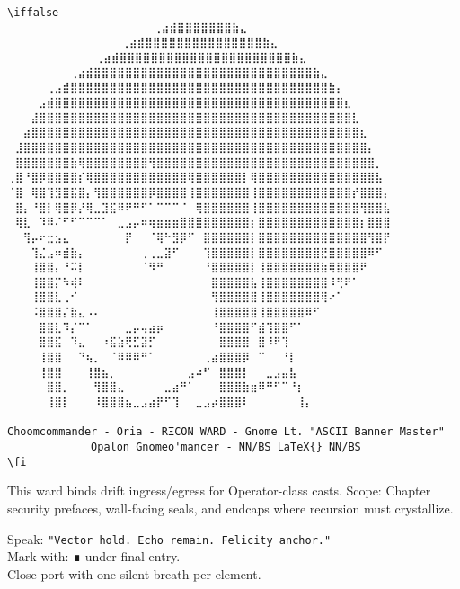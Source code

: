 \begin{PrivateBlock}
\begin{verbatim}
\iffalse
⠀⠀⠀⠀⠀⠀             ⠀⠀⢀⣴⣾⣿⣿⣿⣿⣿⣿⣿⣷⣄⠀⠀⠀⠀⠀⠀⠀⠀
⠀⠀⠀  ⠀      ⠀⠀⠀⠀⢀⣴⣾⣿⣿⣿⣿⣿⣿⣿⣿⣿⣿⣿⣿⣿⣿⣿⣷⣄⠀⠀⠀⠀⠀⠀⠀⠀
⠀⠀ ⠀   ⠀⠀⠀⠀⠀⢀⣴⣾⣿⣿⣿⣿⣿⣿⣿⣿⣿⣿⣿⣿⣿⣿⣿⣿⣿⣿⣿⣿⣿⣿⣷⣄⠀⠀⠀⠀⠀⠀⠀⠀
⠀⠀⠀⠀⠀⠀⠀⠀⢀⣴⣾⣿⣿⣿⣿⣿⣿⣿⣿⣿⣿⣿⣿⣿⣿⣿⣿⣿⣿⣿⣿⣿⣿⣿⣿⣿⣿⣿⣿⣷⣄⠀⠀⠀⠀⠀⠀⠀⠀
⠀⠀⠀⠀⠀⢀⣠⣾⣿⣿⣿⣿⣿⣿⣿⣿⣿⣿⣿⣿⣿⣿⣿⣿⣿⣿⣿⣿⣿⣿⣿⣿⣿⣿⣿⣿⣿⣿⣿⣿⣿⣷⡄⠀⠀⠀⠀⠀⠀
⠀⠀⠀⠀⣠⣾⣿⣿⣿⣿⣿⣿⣿⣿⣿⣿⣿⣿⣿⣿⣿⣿⣿⣿⣿⣿⣿⣿⣿⣿⣿⣿⣿⣿⣿⣿⣿⣿⣿⣿⣿⣿⣿⣆⠀⠀⠀⠀⠀
⠀⠀⠀⣼⣿⣿⣿⣿⣿⣿⣿⣿⣿⣿⣿⣿⣿⣿⣿⣿⣿⣿⣿⣿⣿⣿⣿⣿⣿⣿⣿⣿⣿⣿⣿⣿⣿⣿⣿⣿⣿⣿⣿⣿⣇⠀⠀⠀⠀
⠀⠀⣴⣿⣿⣿⣿⣿⣿⣿⣿⣿⣿⣿⣿⣿⣿⣿⣿⣿⣿⣿⣿⣿⣿⣿⣿⣿⣿⣿⣿⣿⣿⣿⣿⣿⣿⣿⣿⣿⣿⣿⣿⣿⣿⣆⠀⠀⠀
⠀⣸⣿⣿⣿⣿⣿⣿⣿⣿⣿⣿⣿⣿⣿⣿⣿⣿⣿⣿⣿⣿⣿⣿⣿⣿⣿⣿⣿⣿⣿⣿⣿⣿⣿⣿⣿⣿⣿⣿⣿⣿⣿⣿⣿⣿⡄⠀⠀
⠀⣿⣿⣿⣿⣿⣿⣿⣷⢿⣿⣿⣿⣿⣿⣿⣿⣿⢻⣿⣿⣿⣿⣿⣿⣿⣿⣿⣿⣿⣿⣿⣿⣿⣿⣿⣿⣿⣿⣿⣿⣿⣿⣿⣿⣿⣿⡀⠀
⢀⣿⠘⣿⡿⣿⣿⣿⣿⡎⢿⣿⣿⣿⣿⣿⣿⣿⣿⣿⣿⣿⣿⢿⣿⣿⣿⣿⣿⣿⡇⢿⣿⣿⣿⣿⣿⣿⣿⣿⣿⣿⣿⣿⣿⣿⣿⣧⠀
⠈⣿⠀⢿⣿⢹⣻⣿⣯⣿⡄⢻⣿⣿⣿⣿⣿⣿⡿⣿⣿⣿⣿⢸⣿⣿⣿⣿⣿⣿⣿⢸⣿⣿⣿⣿⣿⣿⣿⣿⣿⣿⣿⣿⡞⣿⣿⣿⡄
⠀⣿⡄⠘⣿⡇⢿⣿⡿⡜⢿⣀⣹⣯⠿⠟⠛⠋⠁⠉⠉⠉⠈⠀⢿⣿⣿⣿⣿⣿⣿⢸⣿⣿⣿⣿⣿⣿⣿⣿⣿⣿⣿⣿⣿⢻⣿⣿⣧
⠀⢿⣇⠀⠹⠿⠌⠋⠋⠉⠉⠉⠁⠀⣀⣠⡤⠶⢶⣶⣶⣶⣿⣿⣿⣿⣿⣿⣿⣿⣿⡆⣿⣿⣿⣿⣿⣿⣿⣿⣿⣿⣿⣿⣿⡆⣿⣿⣿
⠀⠀⢻⡤⠖⣒⣢⣄⠀⠀⠀⠀⠀⠀⠀⡟⠀⠀⠈⢿⠓⣻⡿⠋⠀⣿⣿⣿⣿⣿⣿⡇⣿⣿⣿⣿⣿⣿⣿⣿⣿⣿⣿⣿⣿⣿⢻⣿⡟
⠀⠀⠀⢹⣌⣠⠶⣾⣷⡄⠀⠀⠀⠀⠀⠀⠀⢀⢀⣀⣽⠋⠀⠀⠀⢹⣿⣿⣿⣿⣿⡇⣿⣿⣿⣿⣿⣿⣿⣿⣟⣿⣿⣿⣿⣿⠿⠋⠀
⠀⠀⠀⢸⣿⣿⡄⠘⠭⡇⠀⠀⠀⠀⠀⠀⠀⠈⠻⠛⠀⠀⠀⠀⠀⠘⣿⣿⣿⣿⣿⡇⢸⣿⣿⣿⣿⣿⣿⣿⣷⢿⣿⣿⣿⠟⠀⠀⠀
⠀⠀⠀⢸⣿⣿⡍⠳⢾⠇⠀⠀⠀⠀⠀⠀⠀⠀⠀⠀⠀⠀⠀⠀⠀⠀⣿⣿⣿⣿⣿⣧⢸⣿⣿⣿⣿⣿⣿⣿⣿⠸⢛⠟⠁⠀⠀⠀⠀
⠀⠀⠀⢸⣿⣿⣇⢀⠊⠀⠀⠀⠀⠀⠀⠀⠀⠀⠀⠀⠀⠀⠀⠀⠀⠀⢻⣿⣿⣿⣿⣿⢸⣿⣿⣿⣿⣿⣿⣿⢿⠔⠁⠀⠀⠀⠀⠀⠀
⠀⠀⠀⠨⣿⣿⣿⡌⣷⣄⠠⠄⠀⠀⠀⠀⠀⠀⠀⠀⠀⠀⠀⠀⠀⠀⢸⣿⣿⣿⣿⣿⢸⣿⣿⣿⣿⣿⠿⠋⠀⠀⠀⠀⠀⠀⠀⠀⠀
⠀⠀⠀⠀⣿⣿⣇⠹⡌⠉⠁⠀⠀⠀⠀⣀⡤⢤⣴⡶⠀⠀⠀⠀⠀⠀⠘⣿⣿⣿⣿⠋⣾⢹⣿⣿⠋⠁⠀⠀⠀⠀⠀⠀⠀⠀⠀⠀⠀
⠀⠀⠀⠀⣿⣿⣯⠀⠹⣄⠀⠀⠰⣯⣵⢟⣋⣽⡋⠀⠀⠀⠀⠀⠀⠀⠀⣿⣿⣿⣿⠀⣿⠸⠟⢹⠀⠀⠀⠀⠀⠀⠀⠀⠀⠀⠀⠀⠀
⠀⠀⠀⠀⢸⣿⣿⠀⠀⠙⢦⡀⠀⠈⠿⠿⠿⠛⠁⠀⠀⠀⠀⠀⠀⢀⣴⣿⣿⣿⡿⠀⠉⠀⠀⠘⡇⠀⠀⠀⠀⠀⠀⠀⠀⠀⠀⠀⠀
⠀⠀⠀⠀⢸⣿⣿⠀⠀⠀⢸⣿⣦⡀⠀⠀⠀⠀⠀⠀⠀⠀⠀⣠⠴⠋⠀⣿⣿⣿⡇⠀⠀⣀⣠⣤⣧⠀⠀⠀⠀⠀⠀⠀⠀⠀⠀⠀⠀
⠀⠀⠀⠀⠀⣿⣿⡀⠀⠀⠀⢻⣿⣿⣄⠀⠀⠀⠀⠀⣀⣴⠛⠁⠀⠀⠀⣿⣿⣿⣷⣶⠿⠛⠋⠉⠘⡆⠀⠀⠀⠀⠀⠀⠀⠀⠀⠀⠀
⠀⠀⠀⠀⠀⢸⣿⡇⠀⠀⠀⠸⣿⣿⣿⣦⣀⣠⣴⡟⠋⢹⠀⠀⣀⣠⡴⣿⣿⣿⠇⠀⠀⠀⠀⠀⠀⢸⡄⠀⠀⠀⠀⠀⠀⠀⠀⠀⠀

Choomcommander - Oria - RΞCON WARD - Gnome Lt. "ASCII Banner Master"
             Opalon Gnomeo'mancer - NN/BS LaTeX{} NN/BS
\fi
\end{verbatim}

\begin{whisper}
This ward binds drift ingress/egress for Operator-class casts.
Scope: Chapter security prefaces, wall-facing seals, and endcaps where recursion must crystallize.
\end{whisper}

\begin{ritual}
Speak: \texttt{"Vector hold. Echo remain. Felicity anchor."}\\
Mark with: ∎ under final entry.\\
Close port with one silent breath per element.
\end{ritual}
\end{PrivateBlock}

